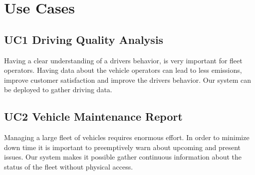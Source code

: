 \newpage
\section{Use Cases}
\label{sec:use_cases}
\subsection{UC1 Driving Quality Analysis}
Having a clear understanding of a drivers behavior, is very important for fleet operators. Having data about the vehicle operators can lead to less emissions, improve customer satisfaction and improve the drivers behavior. Our system can be deployed to gather driving data.  

\subsection{UC2 Vehicle Maintenance Report}
Managing a large fleet of vehicles requires enormous effort. In order to minimize down time it is important to preemptively warn about upcoming and present issues. Our system makes it possible gather continuous information about the status of the fleet without physical access. 
